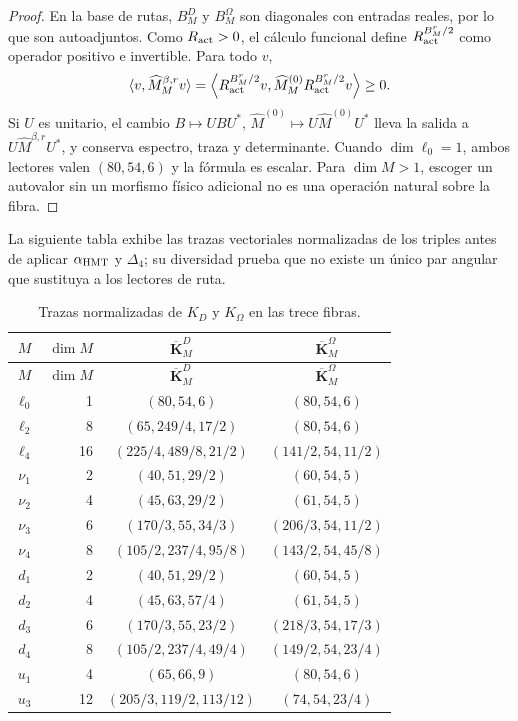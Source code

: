 \begin{proof}
En la base de rutas, \(B_M^D\) y \(B_M^\Omega\) son diagonales con entradas
reales, por lo que son autoadjuntos. Como \(R_{\rm act}>0\), el cálculo
funcional define \(R_{\rm act}^{B_M^r/2}\) como operador positivo e
invertible. Para todo \(v\),
\[
 \langle v,\widehat M_M^{\beta,r}v\rangle
 =\left\langle R_{\rm act}^{B_M^r/2}v,
 \widehat M_M^{(0)}R_{\rm act}^{B_M^r/2}v\right\rangle\ge0.
\]
Si \(U\) es unitario, el cambio
\(B\mapsto UBU^*\), \(\widehat M^{(0)}\mapsto
U\widehat M^{(0)}U^*\) lleva la salida a
\(U\widehat M^{\beta,r}U^*\), y conserva espectro, traza y determinante.
Cuando \(\dim\ell_0=1\), ambos lectores valen \((80,54,6)\) y la fórmula
es escalar. Para \(\dim M>1\), escoger un autovalor sin un morfismo físico
adicional no es una operación natural sobre la fibra.
\end{proof}

La siguiente tabla exhibe las trazas vectoriales normalizadas de los triples
antes de aplicar \(\alpha_{\rm HMT}\) y \(\Delta_4\); su diversidad prueba
que no existe un único par angular que sustituya a los lectores de ruta.
\begin{longtable}{@{}c r c c@{}}
\caption{Trazas normalizadas de \(K_D\) y \(K_\Omega\) en las trece fibras.}
\label{10j-tab-trazas-13}\\
\toprule
\(M\)&\(\dim M\)&\(\overline{\mathbf K}_M^D\)&
\(\overline{\mathbf K}_M^\Omega\)\\
\midrule
\endfirsthead
\toprule
\(M\)&\(\dim M\)&\(\overline{\mathbf K}_M^D\)&
\(\overline{\mathbf K}_M^\Omega\)\\
\midrule
\endhead
\(\ell_0\)&1&\((80,54,6)\)&\((80,54,6)\)\\
\(\ell_2\)&8&\((65,249/4,17/2)\)&\((80,54,6)\)\\
\(\ell_4\)&16&\((225/4,489/8,21/2)\)&\((141/2,54,11/2)\)\\
\(\nu_1\)&2&\((40,51,29/2)\)&\((60,54,5)\)\\
\(\nu_2\)&4&\((45,63,29/2)\)&\((61,54,5)\)\\
\(\nu_3\)&6&\((170/3,55,34/3)\)&\((206/3,54,11/2)\)\\
\(\nu_4\)&8&\((105/2,237/4,95/8)\)&\((143/2,54,45/8)\)\\
\(d_1\)&2&\((40,51,29/2)\)&\((60,54,5)\)\\
\(d_2\)&4&\((45,63,57/4)\)&\((61,54,5)\)\\
\(d_3\)&6&\((170/3,55,23/2)\)&\((218/3,54,17/3)\)\\
\(d_4\)&8&\((105/2,237/4,49/4)\)&\((149/2,54,23/4)\)\\
\(u_1\)&4&\((65,66,9)\)&\((80,54,6)\)\\
\(u_3\)&12&\((205/3,119/2,113/12)\)&\((74,54,23/4)\)\\
\bottomrule
\end{longtable}

